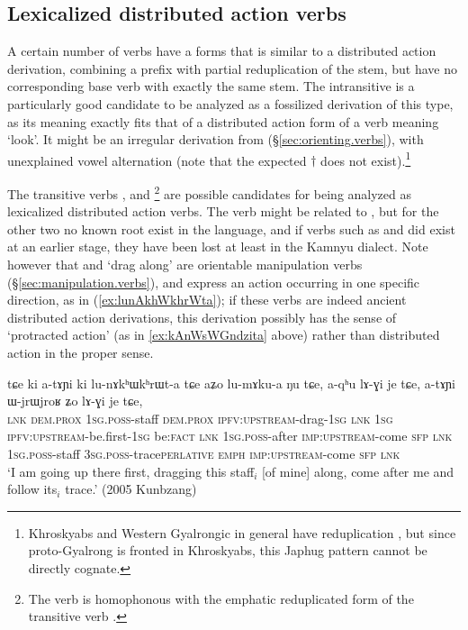 \subsection{Lexicalized distributed action verbs} \label{sec:distributed.action.lexicalized} 
A certain number of verbs have a forms that is similar to a distributed action derivation, combining a  prefix with partial reduplication of the stem, but have no corresponding base verb with exactly the same stem. The intransitive  is a particularly good candidate to be analyzed as a fossilized derivation of this type, as its meaning exactly fits that of a distributed action form of a verb meaning `look'. It might be an irregular derivation from  (§\ref{sec:orienting.verbs}), with unexplained vowel alternation (note that the expected $\dagger$ does not exist).\footnote{Khroskyabs and Western Gyalrongic in general have   reduplication \citep{lai13fuyin}, but since proto-Gyalrong  is fronted in Khroskyabs, this Japhug pattern cannot be directly cognate.}

The transitive verbs ,  and \footnote{The verb  is homophonous with the emphatic reduplicated form of the transitive verb . } are possible candidates for being analyzed as lexicalized distributed action verbs. The verb  might be related to , but for the other two no known root exist in the language, and if verbs such as  and  did exist at an earlier stage, they have been lost at least in the Kamnyu dialect. Note however that  and  `drag along' are orientable manipulation verbs (§\ref{sec:manipulation.verbs}), and express an action occurring in one specific direction, as in (\ref{ex:lunAkhWkhrWta}); if these verbs are indeed ancient distributed action derivations, this derivation possibly has the sense of `protracted action' (as in \ref{ex:kAnWsWGndzita}  above) rather than distributed action in the proper sense.

\begin{exe}
\ex \label{ex:lunAkhWkhrWta}
\gll tɕe ki a-tɤɲi ki lu-nɤkʰɯkʰrɯt-a tɕe aʑo lu-mɤku-a ŋu tɕe, a-qʰu lɤ-ɣi je tɕe, a-tɤɲi ɯ-jrɯ\redp{}jroʁ ʑo lɤ-ɣi je tɕe, \\
\textsc{lnk} \textsc{dem}.\textsc{prox} \textsc{1sg}.\textsc{poss}-staff \textsc{dem}.\textsc{prox} \textsc{ipfv}:\textsc{upstream}-drag-\textsc{1sg} \textsc{lnk} \textsc{1sg} \textsc{ipfv}:\textsc{upstream}-be.first-\textsc{1sg} be:\textsc{fact} \textsc{lnk} \textsc{1sg}.\textsc{poss}-after \textsc{imp}:\textsc{upstream}-come \textsc{sfp} \textsc{lnk} \textsc{1sg}.\textsc{poss}-staff \textsc{3sg}.\textsc{poss}-trace\redp{}\textsc{perlative} \textsc{emph} \textsc{imp}:\textsc{upstream}-come \textsc{sfp} \textsc{lnk} \\
\glt `I am going up there first, dragging this staff$_i$ [of mine] along, come after me and follow its$_i$ trace.' (2005 Kunbzang)
\end{exe}

